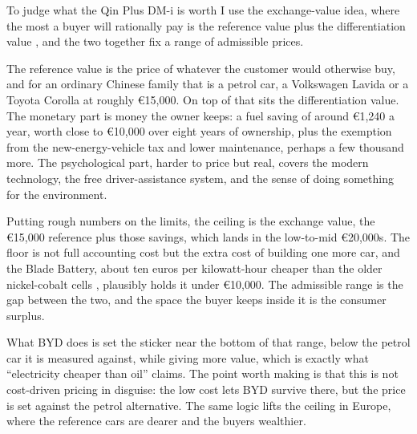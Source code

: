 
To judge what the Qin Plus DM-i is worth I use the exchange-value idea, where the most a buyer will rationally pay is the reference value plus the differentiation value \cite{nagle2018}, and the two together fix a range of admissible prices.

The reference value is the price of whatever the customer would otherwise buy, and for an ordinary Chinese family that is a petrol car, a Volkswagen Lavida or a Toyota Corolla at roughly \euro15{,}000. On top of that sits the differentiation value. The monetary part is money the owner keeps: a fuel saving of around \euro1{,}240 a year, worth close to \euro10{,}000 over eight years of ownership, plus the exemption from the new-energy-vehicle tax and lower maintenance, perhaps a few thousand more. The psychological part, harder to price but real, covers the modern technology, the free driver-assistance system, and the sense of doing something for the environment.

Putting rough numbers on the limits, the ceiling is the exchange value, the \euro15{,}000 reference plus those savings, which lands in the low-to-mid \euro20{,}000s. The floor is not full accounting cost but the extra cost of building one more car, and the Blade Battery, about ten euros per kilowatt-hour cheaper than the older nickel-cobalt cells \cite{motleyfool2025}, plausibly holds it under \euro10{,}000. The admissible range is the gap between the two, and the space the buyer keeps inside it is the consumer surplus.

What BYD does is set the sticker near the bottom of that range, below the petrol car it is measured against, while giving more value, which is exactly what ``electricity cheaper than oil'' claims. The point worth making is that this is not cost-driven pricing in disguise: the low cost lets BYD survive there, but the price is set against the petrol alternative. The same logic lifts the ceiling in Europe, where the reference cars are dearer and the buyers wealthier.
